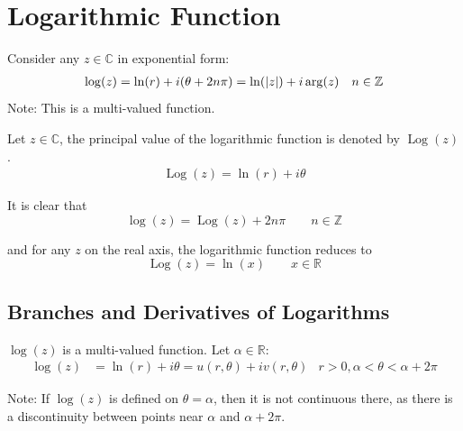 \documentclass[12pt, english]{book}
\begin{document}
	\section{Logarithmic Function} \label{Logarithmic Function Section - Complex}
	
	\begin{definition}
		\label{Logarithmic Function Definition - Complex}
		Consider any \(z \in \mathbb{C}\) in exponential form:
		\begin{align*}
			\log(z) &= \ln(r) + i(\theta + 2n\pi) = \ln(\abs{z}) + i\arg(z) & n \in \mathbb{Z }
		\end{align*}
		Note: This is a multi-valued function.
	\end{definition}
	
	\begin{definition}
		\label{Principal Value of the Logarithmic Function Definition - Complex}
		Let \(z \in \mathbb{C}\), the principal value of the logarithmic function is denoted by \(\operatorname{Log}(z)\).
		\begin{align*}
			\operatorname{Log}(z) = \ln(r) + i\theta
		\end{align*}
	\end{definition}
	
	It is clear that 
	\[\log(z) = \operatorname{Log}(z) + 2n \pi \qquad n \in \mathbb{Z}\]
	
	and for any \(z\) on the real axis, the logarithmic function reduces to 
	\[\operatorname{Log}(z) = \ln(x) \qquad x \in \mathbb{R}\]
	
	\subsection{Branches and Derivatives of Logarithms} \label{Branches and Derivatives of Logarithms Subsection - Complex}
	
	\(\log(z)\) is a multi-valued function. Let \(\alpha \in \mathbb{R}\):
	\begin{align*}
		\log(z) &= \ln(r) + i \theta = u(r, \theta) + i v(r,\theta) &
			r>0, \alpha < \theta < \alpha + 2 \pi
	\end{align*}
	
	Note: If \(\log(z)\) is defined on \(\theta = \alpha\), then it is not continuous there, as there is a discontinuity between points near \(\alpha\) and \(\alpha + 2\pi\).
	
\end{document}
